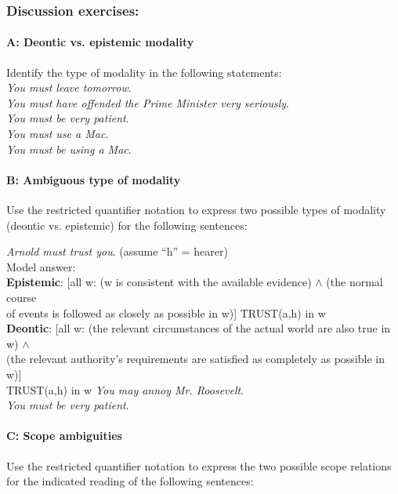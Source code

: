 \subsubsection{Discussion exercises:}\label{sec:}
\paragraph{A: Deontic vs. epistemic modality}
\ea
Identify the type of modality in the following statements:\\
\ea \textit{You must leave tomorrow}.\\
\ex \textit{You must have offended the Prime Minister very seriously}.\\
\ex \textit{You must be very patient}.\\
\ex \textit{You must use a Mac}.\\
\ex \textit{You must be using a Mac}.
                       \z
\z

\paragraph{B: Ambiguous type of modality}

Use the restricted quantifier notation to express two possible types of modality (deontic vs. epistemic) for the following sentences:

\ea
 \ea \textit{Arnold must trust you}.  (assume “h” = hearer)\\
\textsf{Model answer:\\
}\textsf{\textbf{Epistemic}}\textsf{: [all w: (w is consistent with the available evidence) $\wedge$ (the normal course \\
  of events is followed as closely as possible in w)] TRUST(a,h) in w\\
}\textsf{\textbf{Deontic}}\textsf{: [all w: (the relevant circumstances of the actual world are also true in w) $\wedge$\\
  (the relevant authority’s requirements are satisfied as completely as possible in w)]\\
  TRUST(a,h) in w}
\ex \textit{You may annoy Mr. Roosevelt}.\\
\ex \textit{You must be very patient}.
\z \z

\paragraph{C: Scope ambiguities}

Use the restricted quantifier notation to express the two possible scope relations for the indicated reading of the following sentences:

